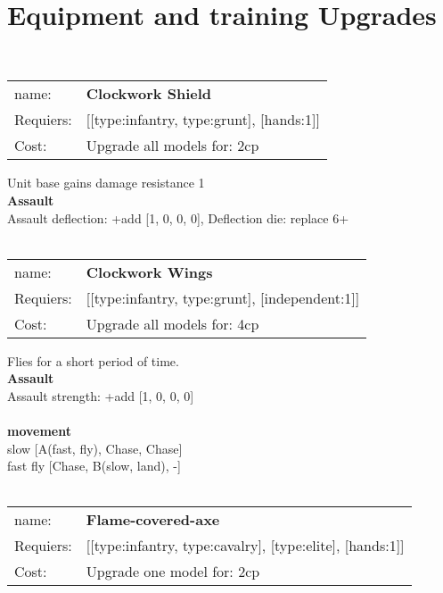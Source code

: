  
\ \\

\section{Equipment and training Upgrades}\ \\
\begin{tabular}{ll}
name: & {\bf Clockwork Shield } \\
Requiers: & [[type:infantry, type:grunt], [hands:1]] \\
Cost: & Upgrade all models for: 2cp \\
\end{tabular}

Unit base gains damage resistance 1\\ 




{\bf Assault} \ \\
Assault deflection: +add [1, 0, 0, 0], Deflection die: replace 6+
\\ 




\ \\
\begin{tabular}{ll}
name: & {\bf Clockwork Wings } \\
Requiers: & [[type:infantry, type:grunt], [independent:1]] \\
Cost: & Upgrade all models for: 4cp \\
\end{tabular}

Flies for a short period of time.\\ 




{\bf Assault} \ \\
Assault strength: +add [1, 0, 0, 0] 
\\ 



\ \\ {\bf movement } \\
slow [A(fast, fly), Chase, Chase] \\
fast fly [Chase, B(slow, land), -] \\

\ \\
\begin{tabular}{ll}
name: & {\bf Flame-covered-axe } \\
Requiers: & [[type:infantry, type:cavalry], [type:elite], [hands:1]] \\
Cost: & Upgrade one model for: 2cp \\
\end{tabular}






